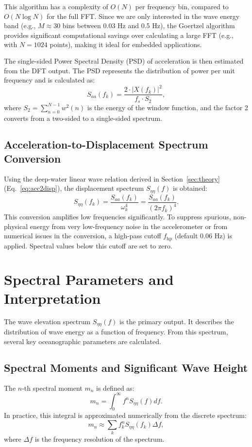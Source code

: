 \documentclass[11pt,letterpaper]{article}
\begin{document}
This algorithm has a complexity of $O(N)$ per frequency bin, compared to $O(N \log N)$ for the full FFT. Since we are only interested in the wave energy band (e.g., $M \approx 30$ bins between 0.03 Hz and 0.5 Hz), the Goertzel algorithm provides significant computational savings over calculating a large FFT (e.g., with $N=1024$ points), making it ideal for embedded applications.

The single-sided Power Spectral Density (PSD) of acceleration is then estimated from the DFT output. The PSD represents the distribution of power per unit frequency and is calculated as:
\begin{equation}
S_{aa}(f_k) = \frac{2 \cdot |X(f_k)|^2}{f_s \cdot S_2},
\end{equation}
where $S_2 = \sum_{n=0}^{N-1} w^2(n)$ is the energy of the window function, and the factor 2 converts from a two-sided to a single-sided spectrum.

\subsection{Acceleration-to-Displacement Spectrum Conversion}
Using the deep-water linear wave relation derived in Section~\ref{sec:theory} (Eq.~\ref{eq:acc2disp}), the displacement spectrum $S_{\eta\eta}(f)$ is obtained:
\begin{equation}
S_{\eta\eta}(f_k) = \frac{S_{aa}(f_k)}{\omega_k^4} = \frac{S_{aa}(f_k)}{(2\pi f_k)^4}.
\end{equation}
This conversion amplifies low frequencies significantly. To suppress spurious, non-physical energy from very low-frequency noise in the accelerometer or from numerical issues in the conversion, a high-pass cutoff $f_\text{hp}$ (default $0.06$ Hz) is applied. Spectral values below this cutoff are set to zero.

\section{Spectral Parameters and Interpretation}
\label{sec:params}
The wave elevation spectrum $S_{\eta\eta}(f)$ is the primary output. It describes the distribution of wave energy as a function of frequency. From this spectrum, several key oceanographic parameters are calculated.

\subsection{Spectral Moments and Significant Wave Height}
The $n$-th spectral moment $m_n$ is defined as:
\begin{equation}
m_n = \int_{0}^{\infty} f^n S_{\eta\eta}(f)  df.
\end{equation}
In practice, this integral is approximated numerically from the discrete spectrum:
\begin{equation}
m_n \approx \sum_{k} f_k^n S_{\eta\eta}(f_k) \Delta f,
\end{equation}
where $\Delta f$ is the frequency resolution of the spectrum.
\end{document}
